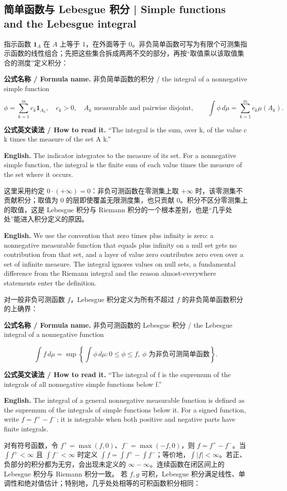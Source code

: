 \documentclass[UTF8,11pt,a4paper]{ctexart}
\newcommand{\EN}[1]{\par\noindent\textbf{English.} #1\par}
\newcommand{\READ}[1]{\par\noindent\textbf{公式英文读法 / How to read it.} #1\par}
\let\APSsubsection\subsection
\renewcommand{\subsection}[1]{\Needspace{6\baselineskip}\APSsubsection{#1}}
\newcommand{\FORMULA}[2]{\par\Needspace{3\baselineskip}\noindent\textbf{公式名称 / Formula name.} #1 / #2\par}
\begin{document}
\subsection{简单函数与 Lebesgue 积分 | Simple functions and the Lebesgue integral}
\noindent 指示函数 $\mathbf1_A$ 在 $A$ 上等于 $1$，在外面等于 $0$。非负简单函数可写为有限个可测集指示函数的线性组合；先把这些集合拆成两两不交的部分，再按“取值乘以该取值集合的测度”定义积分：
\FORMULA{非负简单函数的积分}{the integral of a nonnegative simple function}
\[
\phi=\sum_{k=1}^m c_k\mathbf1_{A_k},\quad c_k>0,
\quad A_k\text{ measurable and pairwise disjoint},
\qquad
\int\phi\,d\mu=\sum_{k=1}^m c_k\mu(A_k).
\]
\READ{“The integral is the sum, over k, of the value c k times the measure of the set A k.”}
\EN{The indicator integrates to the measure of its set. For a nonnegative simple function, the integral is the finite sum of each value times the measure of the set where it occurs.}
\noindent 这里采用约定 $0\cdot(+\infty)=0$：非负可测函数在零测集上取 $+\infty$ 时，该零测集不贡献积分；取值为 $0$ 的层即使覆盖无限测度集，也只贡献 $0$。积分不区分零测集上的取值，这是 Lebesgue 积分与 Riemann 积分的一个根本差别，也是“几乎处处”能进入积分定义的原因。
\EN{We use the convention that zero times plus infinity is zero: a nonnegative measurable function that equals plus infinity on a null set gets no contribution from that set, and a layer of value zero contributes zero even over a set of infinite measure. The integral ignores values on null sets, a fundamental difference from the Riemann integral and the reason almost-everywhere statements enter the definition.}
\noindent 对一般非负可测函数 $f$，Lebesgue 积分定义为所有不超过 $f$ 的非负简单函数积分的上确界：
\FORMULA{非负可测函数的 Lebesgue 积分}{the Lebesgue integral of a nonnegative function}
\[
\int f\,d\mu=
\sup\left\{\int\phi\,d\mu:0\le\phi\le f,\ \phi\text{ 为非负可测简单函数}\right\}.
\]
\READ{“The integral of f is the supremum of the integrals of all nonnegative simple functions below f.”}
\EN{The integral of a general nonnegative measurable function is defined as the supremum of the integrals of simple functions below it. For a signed function, write $f=f^+-f^-$; it is integrable when both positive and negative parts have finite integrals.}
\noindent 对有符号函数，令 $f^+=\max(f,0)$、$f^- =\max(-f,0)$，则 $f=f^+-f^-$。当 $\int f^+<\infty$ 且 $\int f^-<\infty$ 时定义 $\int f=\int f^+-\int f^-$；等价地，$\int|f|<\infty$。若正、负部分的积分都为无穷，会出现未定义的 $\infty-\infty$。连续函数在闭区间上的 Lebesgue 积分与 Riemann 积分一致。
\noindent 若 $f,g$ 可积，Lebesgue 积分满足线性、单调性和绝对值估计；特别地，几乎处处相等的可积函数积分相同：
\end{document}
